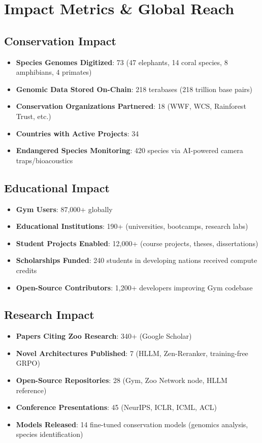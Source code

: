 \section{Impact Metrics \& Global Reach}


\subsection{Conservation Impact}

\begin{itemize}
    \item \textbf{Species Genomes Digitized}: 73 (47 elephants, 14 coral species, 8 amphibians, 4 primates)
    \item \textbf{Genomic Data Stored On-Chain}: 218 terabases (218 trillion base pairs)
    \item \textbf{Conservation Organizations Partnered}: 18 (WWF, WCS, Rainforest Trust, etc.)
    \item \textbf{Countries with Active Projects}: 34
    \item \textbf{Endangered Species Monitoring}: 420 species via AI-powered camera traps/bioacoustics
\end{itemize}

\subsection{Educational Impact}

\begin{itemize}
    \item \textbf{Gym Users}: 87,000+ globally
    \item \textbf{Educational Institutions}: 190+ (universities, bootcamps, research labs)
    \item \textbf{Student Projects Enabled}: 12,000+ (course projects, theses, dissertations)
    \item \textbf{Scholarships Funded}: 240 students in developing nations received compute credits
    \item \textbf{Open-Source Contributors}: 1,200+ developers improving Gym codebase
\end{itemize}

\subsection{Research Impact}

\begin{itemize}
    \item \textbf{Papers Citing Zoo Research}: 340+ (Google Scholar)
    \item \textbf{Novel Architectures Published}: 7 (HLLM, Zen-Reranker, training-free GRPO)
    \item \textbf{Open-Source Repositories}: 28 (Gym, Zoo Network node, HLLM reference)
    \item \textbf{Conference Presentations}: 45 (NeurIPS, ICLR, ICML, ACL)
    \item \textbf{Models Released}: 14 fine-tuned conservation models (genomics analysis, species identification)
\end{itemize}

